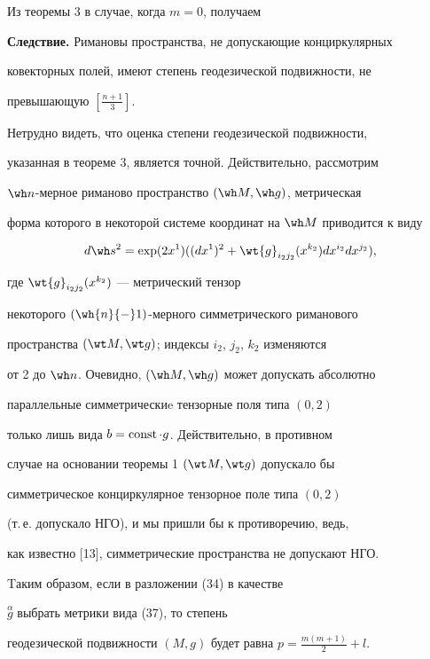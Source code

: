 Из теоремы 3 в случае, когда $m=0$, получаем


\medskip





{\bf Следствие.} Римановы пространства, не допускающие конциркулярных 


ковекторных полей, имеют степень геодезической подвижности, не 


превышающую $[\frac {n+1}3]$.





\begin{note}


Нетрудно видеть, что оценка степени геодезической подвижности, 


указанная в теореме 3, является точной. Действительно, рассмотрим


$\wh n$-мерное риманово пространство $(\wh M, \wh g)$, метрическая


форма которого в некоторой системе координат на $\wh M$ приводится к виду


\begin{equation}


d \wh s{}^2 =\exp (2x^1) ((dx^1)^2+\wt {g}_{{i_2 }{j_2}}(x^{k_2})


dx^{i_2}dx^{j_2}),


\end{equation} 


где $\wt {g}_{{i_2 }{j_2}}(x^{k_2})$ --- метрический тензор


некоторого $ (\wh {n}{-}1)$-мерного симметрического риманового 


пространства $(\wt M,\wt g)$; индексы $i_2$, $j_2$, $k_2$ изменяются 


от 2 до $\wh n$. Очевидно, $(\wh M, \wh g)$ может допускать абсолютно 


параллельные симметрическиe тензорные поля типа $(0, 2)$


только лишь вида $b =\operatorname{const}\cdot g$. Действительно, в противном 


случае на основании теоремы 1 $(\wt M, \wt g)$ допускало бы 


симметрическое конциркулярное тензорное поле типа $(0, 2)$


(т.\,е. допускало НГО), и мы пришли бы к противоречию, ведь, 


как известно [13], симметрические пространства не допускают НГО.


Tаким образом, если в разложении (34) в качестве


$\overset {\alpha}{g}$ выбрать метрики вида (37), то степень 


геодезической подвижности $(M, g)$ будет равна $ p= \frac {m(m+1)}2 +l$.


\end{note}





